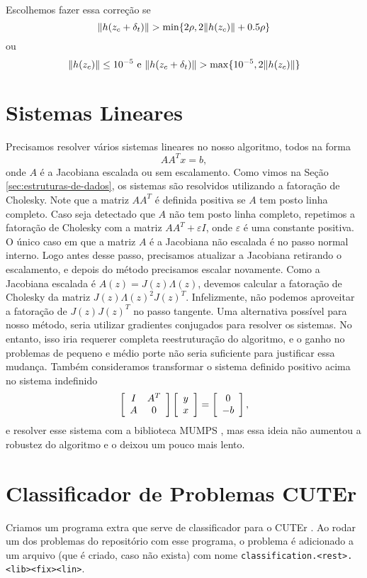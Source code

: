 Escolhemos fazer essa correção se
$$ \Vert h(z_c + \delta_t)\Vert > \min\{2\rho, 2\Vert h(z_c)\Vert + 0.5\rho\} $$
ou
$$ \norma{h(z_c)} \leq 10^{-5} \ \mbox{e} \ 
\norma{h(z_c + \delta_t)} > \max\{10^{-5}, 2\norma{h(z_c)}\} $$

\section{Sistemas Lineares}

Precisamos resolver vários sistemas lineares no nosso algoritmo, todos na forma
$$ AA^Tx = b, $$
onde $A$ é a Jacobiana escalada ou sem escalamento.  Como vimos na Seção
\ref{sec:estruturas-de-dados}, os sistemas são resolvidos utilizando a fatoração
de Cholesky. Note que a matriz $AA^T$ é definida positiva se $A$ tem posto linha
completo. Caso seja detectado que $A$ não tem posto linha completo, repetimos a
fatoração de Cholesky com a matriz $AA^T + \varepsilon I$, onde $\varepsilon$ é
uma constante positiva. O único caso em que
a matriz $A$ é a Jacobiana não escalada é no passo normal interno.  Logo
antes desse passo, precisamos atualizar a Jacobiana retirando o escalamento, e
depois do método precisamos escalar novamente. Como a Jacobiana escalada é $A(z)
= J(z)\Lambda(z)$, devemos calcular a fatoração de Cholesky da matriz
$J(z)\Lambda(z)^2J(z)^T.$ Infelizmente, não podemos aproveitar a fatoração de
$J(z)J(z)^T$ no passo tangente.
Uma alternativa possível para nosso método, seria utilizar gradientes conjugados
para resolver os sistemas.
No entanto, isso iria requerer completa reestruturação do
algoritmo, e o ganho no problemas de pequeno e médio porte não seria suficiente
para justificar essa mudança.  Também consideramos
transformar o sistema definido positivo acima no sistema indefinido
$$\left[\begin{array}{cc}I & A^T \\ A & 0\end{array}\right]\left[\begin{array}{c}y \\ x\end{array}\right] = \left[\begin{array}{c}0 \\ -b\end{array}\right],$$
e resolver esse sistema com a biblioteca MUMPS \cite{bib:mumps1,bib:mumps2}, mas
essa ideia não aumentou a robustez do algoritmo e o deixou um pouco mais lento.

\section{Classificador de Problemas CUTEr}
\label{sec:cuter_classify}

Criamos um programa extra que serve de classificador para o CUTEr 
\cite{bib:classify_cuter}. Ao rodar um dos problemas do repositório com esse programa,
o problema é adicionado a um arquivo (que é criado, caso não exista) com nome
\verb+classification.<rest>.<lib><fix><lin>+. 

